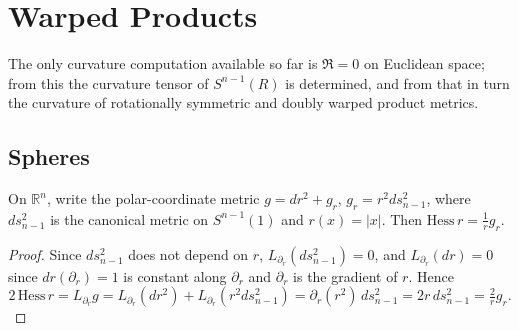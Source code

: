 \section{Warped Products}

The only curvature computation available so far is $\mathfrak{R}=0$ on Euclidean
space; from this the curvature tensor of $S^{n-1}(R)$ is determined, and from that
in turn the curvature of rotationally symmetric and doubly warped product metrics.

\subsection{Spheres}

\begin{proposition}
  \label{prop:pet-ch4-hess-r-euclidean}
  On $\mathbb{R}^n$, write the polar-coordinate metric $g=dr^2+g_r$, $g_r=r^2ds_{n-1}^2$,
  where $ds_{n-1}^2$ is the canonical metric on $S^{n-1}(1)$ and $r(x)=|x|$. Then
  $\mathrm{Hess}\,r=\tfrac1r g_r$.
\end{proposition}
\begin{proof}
  Since $ds_{n-1}^2$ does not depend on $r$, $L_{\partial_r}(ds_{n-1}^2)=0$, and
  $L_{\partial_r}(dr)=0$ since $dr(\partial_r)=1$ is constant along $\partial_r$ and
  $\partial_r$ is the gradient of $r$. Hence
  \[
    2\,\mathrm{Hess}\,r=L_{\partial_r}g=L_{\partial_r}(dr^2)+L_{\partial_r}(r^2ds_{n-1}^2)
    =\partial_r(r^2)\,ds_{n-1}^2=2r\,ds_{n-1}^2=\tfrac2r g_r.
  \]
\end{proof}


